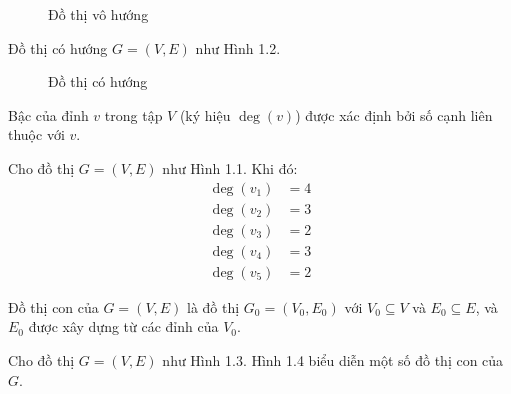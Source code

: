 \documentclass[12pt,oneside,a4paper]{bookAnh1}
\theoremstyle{plain}
\theoremstyle{nonumberplain}
\numberwithin{equation}{chapter}
\begin{document}
{\begin{figure}[hpt!]
	\caption{Đồ thị vô hướng}\label{fig1}
\end{figure}
\begin{example}
Đồ thị có hướng $G=(V,E)$ như Hình 1.2. 

\begin{figure}[hpt!]
	\centering
	\caption{Đồ thị có hướng}\label{fig2}
\end{figure}
\end{example}

\begin{definition}
Bậc của đỉnh $v$ trong tập $V$ (ký hiệu $\deg(v)$) được xác định bởi số cạnh liên thuộc với $v$.    
\end{definition}
\begin{example}
Cho đồ thị $G = (V, E)$ như Hình 1.1. Khi đó:
\begin{align*}
    \deg(v_1) &= 4 \\
    \deg(v_2) &= 3 \\
    \deg(v_3) &= 2 \\
    \deg(v_4) &= 3 \\
    \deg(v_5) &= 2
\end{align*}   
\end{example}
\begin{definition}
Đồ thị con của $G = (V, E)$ là đồ thị $G_0 = (V_0, E_0)$ với $V_0 \subseteq V$ và $E_0 \subseteq E$, và $E_0$ được xây dựng từ các đỉnh của $V_0$.    
\end{definition}
\begin{example}
Cho đồ thị $G = (V, E)$ như Hình 1.3. Hình 1.4 biểu diễn một số đồ thị con của $G$.


\end{example}}
\end{document}
